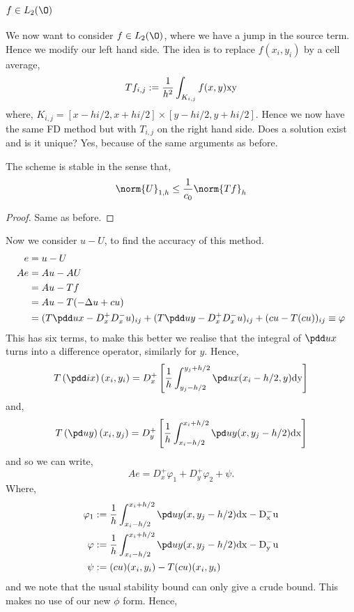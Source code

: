 
\subsection{$f \in L_2(\O)$}
We now want to consider $f \in L_2(\O)$, where we have a jump in the source term. Hence we modify our left hand side. The idea is to replace $f(x_i, y_i)$ by a cell average,
$$ Tf_{i,j} := \frac{1}{h^2}\int_{K_{i,j}} f(x, y)\rm x \rm y $$
where, $K_{i,j} = [x - hi/2, x + hi/2] \times [y - hi/2, y + hi/2]$. Hence we now have the same FD method but with $T_{i,j}$ on the right hand side. Does a solution exist and is it unique? Yes, because of the same arguments as before.

\begin{nthm}
  The scheme is stable in the sense that,
  $$\norm{U}_{1,h} \le \frac{1}{c_0}\norm{Tf}_{h}$$
\end{nthm}
\begin{proof}
  Same as before.
\end{proof}
\noindent
Now we consider $u - U$, to find the accuracy of this method.
\begin{align*}
  e &= u - U \\
  Ae &= Au - AU \\
  &= Au - Tf \\
  &=Au - T(-\Delta u + cu) \\
  &= (T\pdd u x - D_x^+D_x^- u)_{ij} + (T\pdd u y - D_x^+D_x^- u)_{ij} + (cu - T(cu))_{ij} \equiv \varphi
\end{align*}
This has six terms, to make this better we realise that the integral of $\pdd u x$ turns into a difference operator, similarly for $y$. Hence,
$$ T\left( \pdd i x \right)(x_i, y_i) = D_x^+ \left[ \frac{1}{h}\int_{y_j-h/2}^{y_j + h/2} \pd u x (x_i - h/2, y)\rm d y \right] $$
and,
$$ T\left(\pd u y \right)(x_i, y_j) = D_y^+ \left[ \frac{1}{h}\int_{x_i-h/2}^{x_i + h/2} \pd u y (x, y_j - h/2) \rm d x \right] $$
and so we can write,
$$ Ae = D_x^+ \varphi_1 + D_y^+ \varphi_2 + \psi. $$
Where,
\begin{align*}
  \varphi_1 &:=  \frac{1}{h}\int_{x_i-h/2}^{x_i + h/2} \pd u y (x, y_j - h/2) \rm d x - D_x^- u \\
  \varphi &:= \frac{1}{h}\int_{x_i-h/2}^{x_i + h/2} \pd u y (x, y_j - h/2) \rm d x - D_y^-u \\
  \psi &:= (cu)(x_i, y_i) - T(cu)(x_i, y_i)
\end{align*}
and we note that the usual stability bound can only give a crude bound. This makes no use of our new $\phi$ form. Hence,
